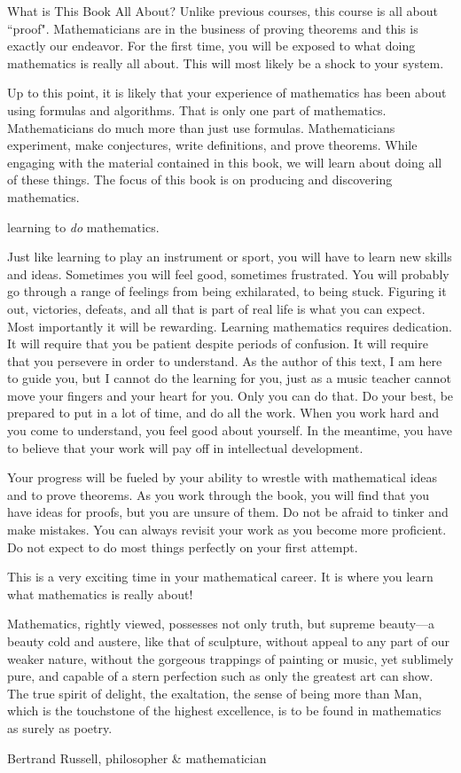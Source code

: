 \begin{section}{What is This Book All About?}
Unlike previous courses, this course is all about ``proof". Mathematicians are in the business of proving theorems and this is exactly our endeavor. For the first time, you will be exposed to what doing mathematics is really all about. This will most likely be a shock to your system. 





Up to this point, it is likely that your experience of mathematics has been about using formulas and algorithms. That is only one part of mathematics. Mathematicians do much more than just use formulas.  Mathematicians experiment, make conjectures, write definitions, and prove theorems.  While engaging with the material contained in this book, we will learn about doing all of these things. The focus of this book is on producing and discovering mathematics.  

learning to \emph{do} mathematics. 
  
Just like learning to play an instrument or sport, you will have to learn new skills and ideas.  Sometimes you will feel good, sometimes frustrated.  You will probably go through a range of feelings from being exhilarated, to being stuck.  Figuring it out, victories, defeats, and all that is part of real life is what you can expect.  Most importantly it will be rewarding.  Learning mathematics requires dedication.  It will require that you be patient despite periods of confusion.  It will require that you persevere in order to understand.  As the author of this text, I am here to guide you, but I cannot do the learning for you, just as a music teacher cannot move your fingers and your heart for you.  Only you can do that.  Do your best, be prepared to put in a lot of time, and do all the work. When you work hard and you come to understand, you feel good about yourself.  In the meantime, you have to believe that your work will pay off in intellectual development.

Your progress will be fueled by your ability to wrestle with mathematical ideas and to prove theorems.  As you work through the book, you will find that you have ideas for proofs, but you are unsure of them.  Do not be afraid to tinker and make mistakes.  You can always revisit your work as you become more proficient. Do not expect to do most things perfectly on your first attempt. 

This is a very exciting time in your mathematical career.  It is where you learn what mathematics is really about!

\epigraph{Mathematics, rightly viewed, possesses not only truth, but supreme beauty---a beauty cold and austere, like that of sculpture, without appeal to any part of our weaker nature, without the gorgeous trappings of painting or music, yet sublimely pure, and capable of a stern perfection such as only the greatest art can show. The true spirit of delight, the exaltation, the sense of being more than Man, which is the touchstone of the highest excellence, is to be found in mathematics as surely as poetry.}{Bertrand Russell, philosopher \& mathematician}

\end{section}

